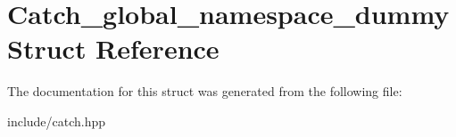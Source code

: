 \hypertarget{structCatch__global__namespace__dummy}{}\section{Catch\+\_\+global\+\_\+namespace\+\_\+dummy Struct Reference}
\label{structCatch__global__namespace__dummy}


The documentation for this struct was generated from the following file\+:\begin{DoxyCompactItemize}
\item 
include/catch.\+hpp\end{DoxyCompactItemize}
